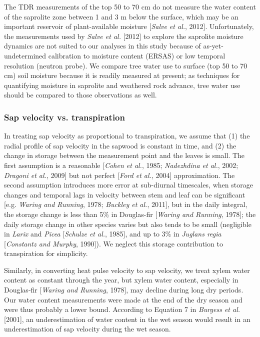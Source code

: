 The TDR measurements of the top 50 to 70 cm do not measure the water content of the saprolite zone between 1 and 3 m below the surface, which may be an important reservoir of plant-available moisture [\textit{Salve et al.}, 2012].  Unfortunately, the measurements used by \textit{Salve et al.} [2012] to explore the saprolite moisture dynamics are not suited to our analyses in this study because of as-yet-undetermined calibration to moisture content (ERSAS) or low temporal resolution (neutron probe).  We compare tree water use to surface (top 50 to 70 cm) soil moisture because it is readily measured at present; as techniques for quantifying moisture in saprolite and weathered rock advance, tree water use should be compared to those observations as well.

\subsubsection{Sap velocity vs. transpiration}
In treating sap velocity as proportional to transpiration, we assume that (1) the radial profile of sap velocity in the sapwood is constant in time, and (2) the change in storage between the measurement point and the leaves is small.  The first assumption is a reasonable [\textit{Cohen et al.}, 1985; \textit{Nadezhdina et al.}, 2002; \textit{Dragoni et al.}, 2009] but not perfect [\textit{Ford et al.}, 2004] approximation.  The second assumption introduces more error at sub-diurnal timescales, when storage changes and temporal lags in velocity between stem and leaf can be significant [e.g. \textit{Waring and Running}, 1978; \textit{Buckley et al.}, 2011], but in the daily integral, the storage change is less than 5\% in Douglas-fir [\textit{Waring and Running}, 1978]; the daily storage change in other species varies but also tends to be small (negligible in \textit{Larix} and \textit{Picea} [\textit{Schulze et al.}, 1985], and up to 3\% in \textit{Juglans regia} [\textit{Constantz and Murphy}, 1990]).  We neglect this storage contribution to transpiration for simplicity.

Similarly, in converting heat pulse velocity to sap velocity, we treat xylem water content as constant through the year, but xylem water content, especially in Douglas-fir [\textit{Waring and Running}, 1978], may decline during long dry periods.  Our water content measurements were made at the end of the dry season and were thus probably a lower bound.  According to Equation 7 in \textit{Burgess et al.} [2001], an underestimation of water content in the wet season would result in an underestimation of sap velocity during the wet season.

